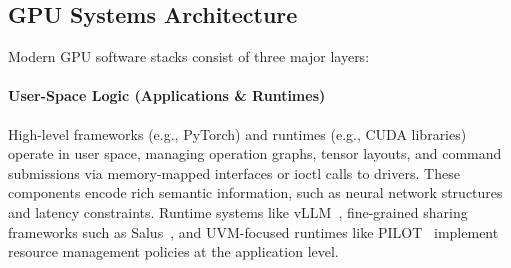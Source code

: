 
\subsection{GPU Systems Architecture}

Modern GPU software stacks consist of three major layers:



\paragraph{User-Space Logic (Applications \& Runtimes)}
High-level frameworks (e.g., PyTorch) and runtimes (e.g., CUDA libraries) operate in user space, managing operation graphs, tensor layouts, and command submissions via memory-mapped interfaces or ioctl calls to drivers. These components encode rich semantic information, such as neural network structures and latency constraints. Runtime systems like vLLM~\cite{kwon2023efficient}, fine-grained sharing frameworks such as Salus~\cite{yu2020fine}, and UVM-focused runtimes like PILOT~\cite{ravi2021pilot} implement resource management policies at the application level.
% 

